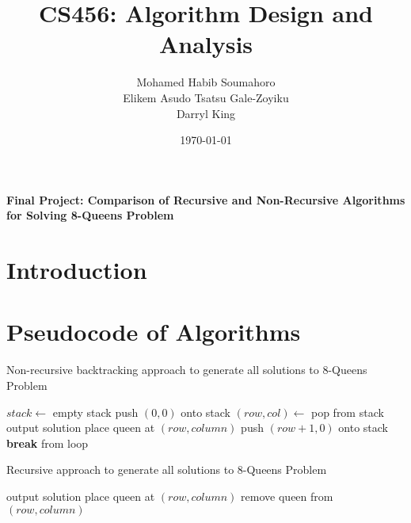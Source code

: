 \documentclass{article}
\title{\textbf{CS456: Algorithm Design and Analysis}}
\author{Mohamed Habib Soumahoro \\ Elikem Asudo Tsatsu Gale-Zoyiku \\ Darryl King}
\date{\today}
\begin{document}
\doublespacing
\maketitle
\begin{center}
    \begin{large}
        \textbf{Final Project: Comparison of Recursive and Non-Recursive Algorithms for Solving 8-Queens Problem\\}
    \end{large}
\end{center}
\newpage
\section*{Introduction}
\newpage
\section*{Pseudocode of Algorithms}
\begin{algorithm}
    \caption{Non-recursive backtracking approach to generate all solutions to 8-Queens Problem}
    \begin{algorithmic}[1]
            \State $stack \gets$ empty stack
            \State push $(0, 0)$ onto stack
                \State $(row, col) \gets$ pop from stack
                        \State output solution
                    \EndIf
                \Else
                            \State place queen at $(row, column)$
                            \State push $(row + 1, 0)$ onto stack
                            \State \textbf{break} from loop
                        \EndIf
                    \EndFor
                \EndIf
            \EndWhile
        \EndProcedure
    \end{algorithmic}
    \end{algorithm}
    
    \begin{algorithm}
    \caption{Recursive approach to generate all solutions to 8-Queens Problem}
    \begin{algorithmic}[1]
                    \State output solution
                \EndIf
            \Else
                        \State place queen at $(row, column)$
                        \State {}
                        \State remove queen from $(row, column)$
                    \EndIf
                \EndFor
            \EndIf
        \EndProcedure
    \end{algorithmic}
    \end{algorithm}
\newpage
\end{document}
